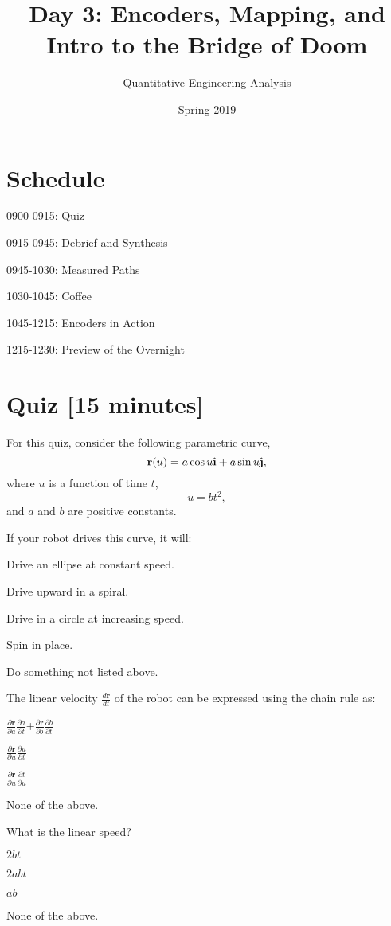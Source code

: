 \documentclass{tufte-handout}
\title{Day 3: Encoders, Mapping, and Intro to the Bridge of Doom}
\author{Quantitative Engineering Analysis}
\date{Spring 2019}
\begin{document}
\maketitle
\thispagestyle{firstpage}

\section{Schedule}
\bi
\item 0900-0915: Quiz
\item 0915-0945: Debrief and Synthesis
\item 0945-1030: Measured Paths
\item 1030-1045: Coffee
\item 1045-1215: Encoders in Action
\item 1215-1230: Preview of the Overnight
\ei

\section{Quiz [15 minutes]}

For this quiz, consider the following parametric curve,
\[ \r(u)= a \cos u \ihat + a \sin u \jhat, \] 
where $u$ is a function of time $t$,
\[ u=b t^2, \]
and $a$ and $b$ are positive constants.

\be
\item If your robot drives this curve, it will:
\be
\item Drive an ellipse at constant speed.
\item Drive upward in a spiral.
\item Drive in a circle at increasing speed.
\item Spin in place.
\item Do something not listed above.
\ee

\item The linear velocity $\frac{d {\mathbf r}}{dt}$ of the robot can be expressed using the chain rule as:
\be
\item $\frac{\partial {\mathbf r}}{\partial a}\frac{\partial a}{\partial t}$+$\frac{\partial {\mathbf r}}{\partial b}\frac{\partial b}{\partial t}$
\item $\frac{\partial {\mathbf r}}{\partial u}\frac{\partial u}{\partial t}$
\item $\frac{\partial {\mathbf r}}{\partial u}\frac{\partial t}{\partial u}$
\item None of the above.

\ee
\item What is the linear speed?
\be
\item $2bt$
\item $2abt$
\item $ab$
\item None of the above.
\ee
\end{document}
